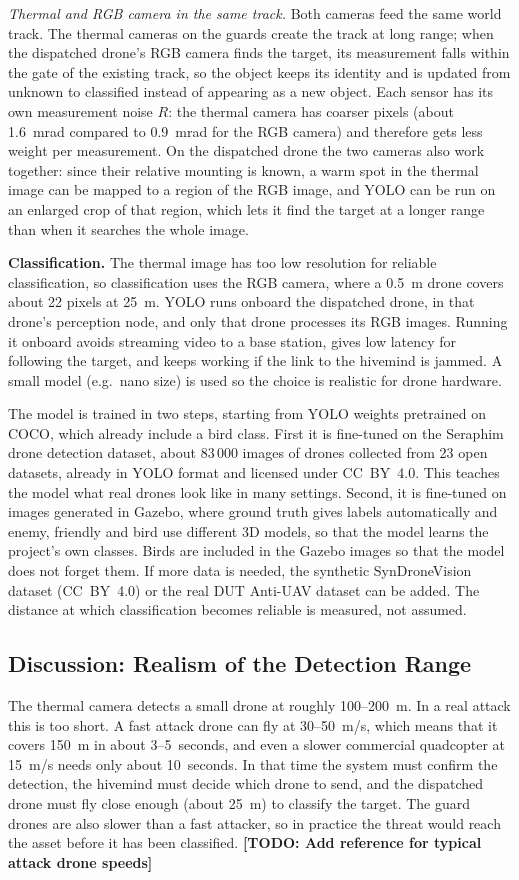 \documentclass{article}
\newcommand{\todo}[1]{\textbf{[TODO: #1]}}
\begin{document}
\emph{Thermal and RGB camera in the same track.} Both cameras feed the same
world track. The thermal cameras on the guards create the track at long
range; when the dispatched drone's RGB camera finds the target, its
measurement falls within the gate of the existing track, so the object
keeps its identity and is updated from unknown to classified instead of
appearing as a new object. Each sensor has its own measurement noise $R$:
the thermal camera has coarser pixels (about 1.6~mrad compared to
0.9~mrad for the RGB camera) and therefore gets less weight per
measurement. On the dispatched drone the two cameras also work together:
since their relative mounting is known, a warm spot in the thermal image
can be mapped to a region of the RGB image, and YOLO can be run on an
enlarged crop of that region, which lets it find the target at a longer
range than when it searches the whole image.

\textbf{Classification.} The thermal image has too low resolution for
reliable classification, so classification uses the RGB camera, where a
0.5~m drone covers about 22 pixels at 25~m. YOLO runs onboard the
dispatched drone, in that drone's perception node, and only that drone
processes its RGB images. Running it onboard avoids streaming video to a base
station, gives low latency for following the target, and keeps working if
the link to the hivemind is jammed. A small model (e.g.\ nano size) is used
so the choice is realistic for drone hardware.

The model is trained in two steps, starting from YOLO weights pretrained on
COCO, which already include a bird class. First it is fine-tuned on the
Seraphim drone detection dataset, about 83\,000 images of drones collected
from 23 open datasets, already in YOLO format and licensed under CC~BY~4.0.
This teaches the model what real drones look like in many settings.
Second, it is fine-tuned on images generated in Gazebo, where ground truth
gives labels automatically and enemy, friendly and bird use different 3D
models, so that the model learns the project's own classes. Birds are
included in the Gazebo images so that the model does not forget them. If
more data is needed, the synthetic SynDroneVision dataset (CC~BY~4.0) or
the real DUT Anti-UAV dataset can be added. The distance at which classification becomes
reliable is measured, not assumed.

\subsection{Discussion: Realism of the Detection Range}\label{sec:range}
The thermal camera detects a small drone at roughly 100--200~m. In a real
attack this is too short. A fast attack drone can fly at 30--50~m/s, which
means that it covers 150~m in about 3--5~seconds, and even a slower
commercial quadcopter at 15~m/s needs only about 10~seconds. In that time
the system must confirm the detection, the hivemind must decide which drone
to send, and the dispatched drone must fly close enough (about 25~m) to
classify the target. The guard drones are also slower than a fast attacker,
so in practice the threat would reach the asset before it has been
classified. \todo{Add reference for typical attack drone speeds}
\end{document}
